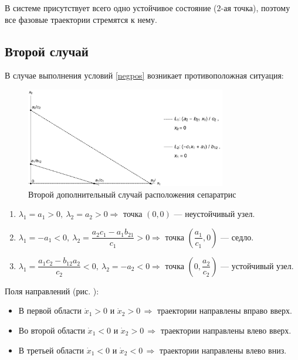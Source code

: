\documentclass[12pt,a4paper]{article}
\begin{document}
    В системе присутствует всего одно устойчивое состояние ($2$-ая точка), поэтому все фазовые траектории стремятся к нему.

    \pagebreak

    \subsection{Второй случай}
    В случае выполнения условий \eqref{negpos} возникает противоположная ситуация:
    \begin{figure}[h]
        \centering
        \includegraphics[width=0.78\textwidth]{sep_4.pdf}
        \caption{Второй дополнительный случай расположения сепаратрис}
        \label{fig:sep_4}
    \end{figure}

    \begin{enumerate}
        \setlength\itemsep{0.5em}
        \item $ \lambda_1 = a_1 > 0,\ \lambda_2 = a_2 > 0 \Rightarrow $ точка $ (0, 0) $ --- неустойчивый узел.
    
        \item $ \lambda_1 = -a_1 < 0,\ \lambda_2 = \dfrac{a_2 c_1 - a_1 b_{21}}{c_1} > 0 \Rightarrow $ точка $ \left( \dfrac{a_1}{c_1}, 0 \right) $ --- седло.
        
        \item  $ \lambda_1 = \dfrac{a_1 c_2 - b_{12} a_2}{c_2} < 0,\ \lambda_2 = -a_2 < 0 \Rightarrow $ точка $ \left( 0, \dfrac{a_2}{c_2} \right) $ --- устойчивый узел.
    \end{enumerate}

    Поля направлений (рис. ): 

    \begin{itemize}
        \setlength\itemsep{0.4em}
        \item В первой области $ \dot x_1 > 0 $ и $ \dot x_2 > 0 \, \Rightarrow $ траектории направлены вправо вверх.
        \item Во второй области $ \dot x_1 < 0 $ и $ \dot x_2 > 0 \, \Rightarrow $ траектории направлены влево вверх.
        \item В третьей области $ \dot x_1 < 0 $ и $ \dot x_2 < 0 \, \Rightarrow $ траектории направлены влево вниз.
    \end{itemize}
\end{document}
